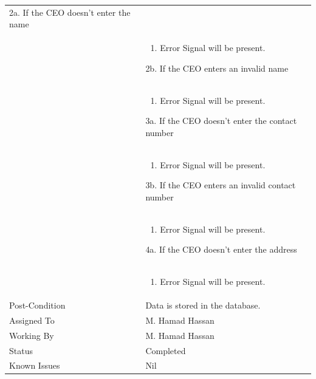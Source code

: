 \documentclass[12pt,a4paper]{article}
\begin{document}
\begin{longtable}{| p{3cm}|p{12cm}|}
2a.  If the CEO doesn't enter the name\\ 	
&	\begin{enumerate}
		\item Error Signal will be present.
	\end{enumerate}
2b. If the CEO enters an invalid name \\ 	
&	\begin{enumerate}
		\item Error Signal will be present.
	\end{enumerate}
3a.  If the CEO doesn't enter the contact number\\ 	
&	\begin{enumerate}
		\item Error Signal will be present.
	\end{enumerate}
3b. If the CEO enters an invalid contact number\\ 	
&	\begin{enumerate}
		\item Error Signal will be present.
	\end{enumerate}
4a.  If the CEO doesn't enter the address\\ 	
&	\begin{enumerate}
		\item Error Signal will be present.
	\end{enumerate}
\\ \hline
Post-Condition &  Data is stored in the database. \\\hline
Assigned To &  M. Hamad Hassan
\\ \hline
Working By &    M. Hamad Hassan
\\ \hline
Status & 	Completed	
\\ \hline
Known Issues & Nil
\\\hline
\end{longtable}

\end{document}
